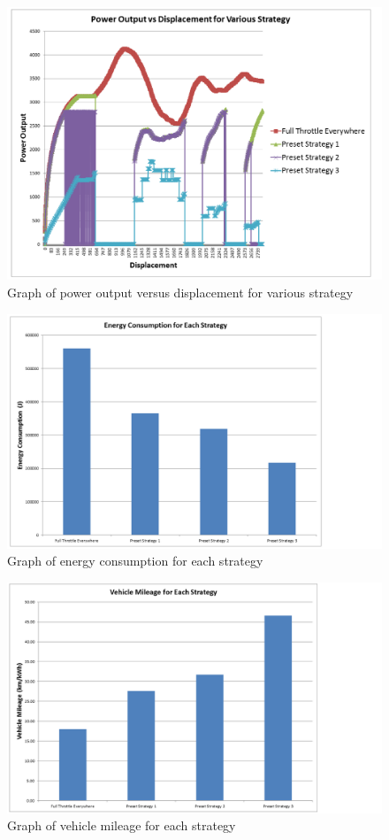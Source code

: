\begin{figure}[htb]
	\centering
	\includegraphics[width=5in]{images/power.png}
	\caption{Graph of power output versus displacement for various strategy}
	\label{im:powerDisp}
\end{figure}

\begin{figure}[htb]
	\centering
	\includegraphics[width=5in]{images/energy.png}
	\caption{Graph of energy consumption for each strategy}
	\label{im:energyHist}
\end{figure}

\begin{figure}[htb]
	\centering
	\includegraphics[width=5in]{images/mileage.png}
	\caption{Graph of vehicle mileage for each strategy}
	\label{im:mileageHist}
\end{figure}

